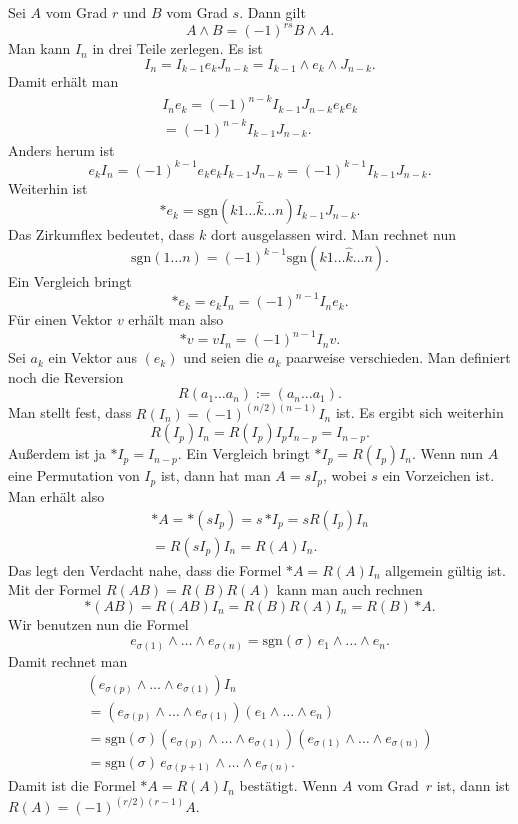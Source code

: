 \documentclass[a4paper,10pt,fleqn,twocolumn,twoside]{article}
\begin{document}
Sei $A$ vom Grad $r$ und $B$ vom Grad $s$. Dann gilt
\[A\wedge B = (-1)^{rs} B\wedge A.\]
Man kann $I_n$ in drei Teile zerlegen. Es ist
\[I_n = I_{k-1}e_k J_{n-k} = I_{k-1}\wedge e_k\wedge J_{n-k}.\]
Damit erhält man
\begin{gather*}
I_n e_k = (-1)^{n-k} I_{k-1}J_{n-k}e_ke_k\\
= (-1)^{n-k} I_{k-1}J_{n-k}.
\end{gather*}
Anders herum ist
\[e_k I_n =  (-1)^{k-1} e_ke_k I_{k-1}J_{n-k}
= (-1)^{k-1} I_{k-1}J_{n-k}.\]
Weiterhin ist
\[*e_k = \mathrm{sgn}(k1\ldots\hat k\ldots n)I_{k-1}J_{n-k}.\]
Das Zirkumflex bedeutet, dass $k$ dort ausgelassen wird.
Man rechnet nun
\[\mathrm{sgn}(1\ldots n) = (-1)^{k-1}
\mathrm{sgn}(k1\ldots\hat k\ldots n).\]
Ein Vergleich bringt
\[*e_k = e_k I_n = (-1)^{n-1} I_n e_k.\]
Für einen Vektor $v$ erhält man also
\[*v = vI_n = (-1)^{n-1}I_n v.\]
Sei $a_k$ ein Vektor aus $(e_k)$ und seien die $a_k$
paarweise verschieden.
Man definiert noch die Reversion
\[R(a_1\ldots a_n) := (a_n\ldots a_1).\]
Man stellt fest, dass $R(I_n)=(-1)^{(n/2)(n-1)}I_n$ ist.
Es ergibt sich weiterhin
\[R(I_p)I_n = R(I_p)I_p I_{n-p} = I_{n-p}.\]
Außerdem ist ja $*I_p = I_{n-p}$. Ein Vergleich bringt $*I_p = R(I_p)I_n$.
Wenn nun $A$ eine Permutation von $I_p$ ist, dann hat man $A=sI_p$,
wobei $s$ ein Vorzeichen ist. Man erhält also
\begin{gather*}
*A = *(sI_p) = s\,{*I_p} = sR(I_p)I_n\\
= R(sI_p)I_n = R(A)I_n.
\end{gather*}
Das legt den Verdacht nahe, dass die Formel
$*A=R(A)I_n$ allgemein gültig ist.
Mit der Formel $R(AB) = R(B)R(A)$ kann man auch rechnen
\[*(AB) = R(AB)I_n = R(B)R(A)I_n = R(B)\,{*A}.\]
Wir benutzen nun die Formel
\[e_{\sigma(1)}\wedge\ldots\wedge e_{\sigma(n)}
= \mathrm{sgn}(\sigma)\, e_1\wedge\ldots\wedge e_n.\]
Damit rechnet man
\begin{gather*}
(e_{\sigma(p)}\wedge\ldots\wedge e_{\sigma(1)})I_n\\
= (e_{\sigma(p)}\wedge\ldots\wedge e_{\sigma(1)})
(e_1\wedge\ldots\wedge e_n)\\
= \mathrm{sgn}(\sigma)(e_{\sigma(p)}\wedge\ldots\wedge e_{\sigma(1)})
(e_{\sigma(1)}\wedge\ldots\wedge e_{\sigma(n)})\\
= \mathrm{sgn}(\sigma)\, e_{\sigma(p+1)}\wedge\ldots\wedge e_{\sigma(n)}.
\end{gather*}
Damit ist die Formel $*A=R(A)I_n$ bestätigt.
Wenn $A$ vom Grad~$r$ ist, dann ist
$R(A) = (-1)^{(r/2)(r-1)}A$.
\end{document}
